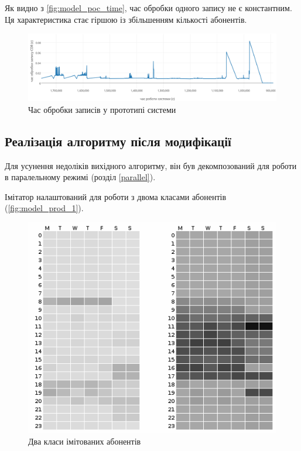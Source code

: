Як видно з \autoref{fig:model_poc_time}, час обробки одного запису не є константним. Ця характеристика стає гіршою із збільшенням кількості абонентів.

\begin{figure}[h!]
        \begin{center}
            \includegraphics[scale=0.13]{resources/poc-time.png}
        \end{center}
        \caption{Час обробки записів у прототипі системи}
        \label{fig:model_poc_time}
\end{figure}

\subsection{Реалізація алгоритму після модифікації}

Для усунення недоліків вихідного алгоритму, він був декомпозований для роботи в паралельному режимі (розділ \ref{parallel}).

Імітатор налаштований для роботи з двома класами абонентів (\autoref{fig:model_prod_1}).

\begin{figure}[h!]
        \begin{center}
            \includegraphics[scale=0.6]{resources/model_2_1.png}
        \end{center}
        \caption{Два класи імітованих абонентів}
        \label{fig:model_prod_1}
\end{figure}

